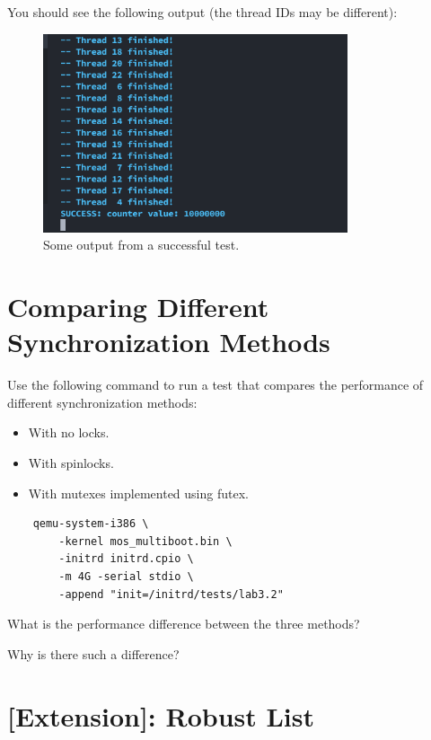You should see the following output (the thread IDs may be different):

\begin{figure}[H]
    \centering
    \includegraphics[width=0.8\textwidth]{assets/c3.futex-output.png}
    \caption{Some output from a successful test.}
\end{figure}

\section{Comparing Different Synchronization Methods}

Use the following command to run a test that compares the performance of different
synchronization methods:

\begin{itemize}
    \item With no locks.
    \item With spinlocks.
    \item With mutexes implemented using futex.
\end{itemize}

\begin{verbatim}
    qemu-system-i386 \
        -kernel mos_multiboot.bin \
        -initrd initrd.cpio \
        -m 4G -serial stdio \
        -append "init=/initrd/tests/lab3.2"
\end{verbatim}

\begin{exercise}
    \item What is the performance difference between the three methods?
    \item Why is there such a difference?
\end{exercise}

\section{[Extension]: Robust List}

